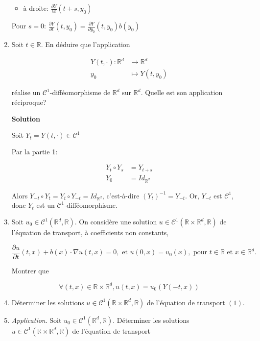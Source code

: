 \documentclass[10pt,a4paper,oneside]{article}
\newenvironment{exercice}[1][Exercice]{\begin{trivlist}
\item[\hskip \labelsep {\bfseries #1}]}{\end{trivlist}}
\begin{document}
\begin{exercice}{4}
\begin{enumerate}
\begin{itemize}
\item
à droite: $\frac{\partial Y}{\partial t}(t + s,y_0)$
\end{itemize}

Pour $s = 0$: $\frac{\partial Y}{\partial t}(t,y_0) = \frac{\partial Y}{\partial y_0}(t,y_0)b(y_0)$

\item
Soit $t \in \mathbb{R}$. En déduire que l'application

\begin{align*}
Y(t,\cdot): \mathbb{R}^d &\to \mathbb{R}^d \\
y_0 &\mapsto Y(t,y_0)
\end{align*}

réalise un $\mathcal{C}^1$-difféomorphisme de $\mathbb{R}^d$ sur $\mathbb{R}^d$. Quelle est son application réciproque?

\textbf{Solution}

Soit $Y_t = Y(t,\cdot) \in \mathcal{C}^1$

Par la partie 1:

\begin{align*}
Y_t \circ Y_s &= Y_{t + s} \\
Y_0 &= Id_{\mathbb{R}^d}
\end{align*}

Alors $Y_{-t} \circ Y_t = Y_t \circ Y_{-t} = Id_{\mathbb{R}^d}$, c'est-à-dire $\boxed{(Y_t)^{-1} = Y_{-t}}$. Or, $Y_{-t}$ est $\mathcal{C}^1$, donc $Y_t$ est un $\mathcal{C}^1$-difféomorphisme.

\item
Soit $u_0 \in \mathcal{C}^1(\mathbb{R}^d,\mathbb{R})$. On considère une solution $u \in \mathcal{C}^1(\mathbb{R} \times \mathbb{R}^d,\mathbb{R})$ de l'équation de transport, à coefficients non constants,

\begin{equation}
\frac{\partial u}{\partial t}(t,x) + b(x) \cdot \nabla u(t,x) = 0,\text{ et }u(0,x) = u_0(x), \text{ pour }t \in \mathbb{R} \text{ et } x \in \mathbb{R}^d.
\end{equation}

Montrer que

\[ \forall(t,x) \in \mathbb{R} \times \mathbb{R}^d, u(t,x) = u_0(Y(-t,x)) \]

\item
Déterminer les solutions $u \in \mathcal{C}^1(\mathbb{R} \times \mathbb{R}^d,\mathbb{R})$ de l'équation de transport $(1)$.

\item
\textit{Application}. Soit $u_0 \in \mathcal{C}^1(\mathbb{R}^d,\mathbb{R})$. Déterminer les solutions $u \in \mathcal{C}^1(\mathbb{R} \times \mathbb{R}^d,\mathbb{R})$ de l'équation de transport


\end{enumerate}
\end{exercice}
\end{document}
